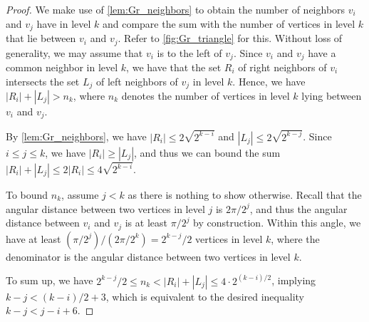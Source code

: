 \documentclass[a4paper,english,cleveref,thm-restate]{lipics-v2021}
\begin{document}
\begin{proof}
    We make use of \cref{lem:Gr_neighbors} to obtain the number of neighbors $ v_i $ and $ v_j $ have in level $ k $ and compare the sum with the number of vertices in level $ k $ that lie between $ v_i $ and $ v_j $.
    Refer to \cref{fig:Gr_triangle} for this.
    Without loss of generality, we may assume that $ v_i $ is to the left of $ v_j $.
    Since $ v_i $ and $ v_j $ have a common neighbor in level $ k $, we have that the set $R_i$ of right neighbors of $ v_i $ intersects the set $L_j$ of left neighbors of $ v_j $ in level $ k $.
    Hence, we have $ |R_i| + |L_j| > n_k $, where $n_k$ denotes the number of vertices in level $ k $ lying between $ v_i $ and $ v_j $.
    
    By \cref{lem:Gr_neighbors}, we have $ |R_i| \leq 2 \sqrt{2^{k-i}} $ and $ |L_j| \leq 2 \sqrt{2^{k-j}} $.
    Since $ i \leq j \leq k $, we have $ |R_i| \geq |L_j| $, and thus we can bound the sum $ |R_i| + |L_j| \leq 2 |R_i| \leq 4 \sqrt{2^{k-i}} $.
    
    To bound $ n_k $, assume $ j < k $ as there is nothing to show otherwise.
    Recall that the angular distance between two vertices in level $ j $ is $ 2\pi / 2^j $, and thus the angular distance between $ v_i $ and $ v_j $ is at least $ \pi / 2^j $ by construction.
    Within this angle, we have at least $ (\pi / 2^j) / (2\pi / 2^k) = 2^{k-j}/2 $ vertices in level $ k $, where the denominator is the angular distance between two vertices in level $ k $.
    
    To sum up, we have 
    $ 2^{k-j}/2 \leq n_k < |R_i| + |L_j| \leq 4 \cdot 2^{(k-i)/2} $,
    implying $ k - j < (k - i)/2 + 3 $, which is equivalent to the desired inequality $ k - j < j - i + 6 $.
\end{proof}

    
    
\end{document}
